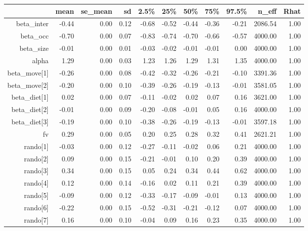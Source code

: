 \begin{table}[ht]
\centering
\begin{tabular}{rrrrrrrrrrr}
  \hline
 & mean & se\_mean & sd & 2.5\% & 25\% & 50\% & 75\% & 97.5\% & n\_eff & Rhat \\ 
  \hline
beta\_inter & -0.44 & 0.00 & 0.12 & -0.68 & -0.52 & -0.44 & -0.36 & -0.21 & 2086.54 & 1.00 \\ 
  beta\_occ & -0.70 & 0.00 & 0.07 & -0.83 & -0.74 & -0.70 & -0.66 & -0.57 & 4000.00 & 1.00 \\ 
  beta\_size & -0.01 & 0.00 & 0.01 & -0.03 & -0.02 & -0.01 & -0.01 & 0.00 & 4000.00 & 1.00 \\ 
  alpha & 1.29 & 0.00 & 0.03 & 1.23 & 1.26 & 1.29 & 1.31 & 1.35 & 4000.00 & 1.00 \\ 
  beta\_move[1] & -0.26 & 0.00 & 0.08 & -0.42 & -0.32 & -0.26 & -0.21 & -0.10 & 3391.36 & 1.00 \\ 
  beta\_move[2] & -0.20 & 0.00 & 0.10 & -0.39 & -0.26 & -0.19 & -0.13 & -0.01 & 3581.05 & 1.00 \\ 
  beta\_diet[1] & 0.02 & 0.00 & 0.07 & -0.11 & -0.02 & 0.02 & 0.07 & 0.16 & 3621.00 & 1.00 \\ 
  beta\_diet[2] & -0.01 & 0.00 & 0.09 & -0.20 & -0.08 & -0.01 & 0.05 & 0.16 & 4000.00 & 1.00 \\ 
  beta\_diet[3] & -0.19 & 0.00 & 0.10 & -0.38 & -0.26 & -0.19 & -0.13 & -0.01 & 3597.18 & 1.00 \\ 
  fv & 0.29 & 0.00 & 0.05 & 0.20 & 0.25 & 0.28 & 0.32 & 0.41 & 2621.21 & 1.00 \\ 
  rando[1] & -0.03 & 0.00 & 0.12 & -0.27 & -0.11 & -0.02 & 0.06 & 0.21 & 4000.00 & 1.00 \\ 
  rando[2] & 0.09 & 0.00 & 0.15 & -0.21 & -0.01 & 0.10 & 0.20 & 0.39 & 4000.00 & 1.00 \\ 
  rando[3] & 0.34 & 0.00 & 0.15 & 0.05 & 0.24 & 0.34 & 0.44 & 0.62 & 4000.00 & 1.00 \\ 
  rando[4] & 0.12 & 0.00 & 0.14 & -0.16 & 0.02 & 0.11 & 0.21 & 0.39 & 4000.00 & 1.00 \\ 
  rando[5] & -0.09 & 0.00 & 0.12 & -0.33 & -0.17 & -0.09 & -0.01 & 0.13 & 4000.00 & 1.00 \\ 
  rando[6] & -0.22 & 0.00 & 0.15 & -0.52 & -0.31 & -0.21 & -0.12 & 0.07 & 4000.00 & 1.00 \\ 
  rando[7] & 0.16 & 0.00 & 0.10 & -0.04 & 0.09 & 0.16 & 0.23 & 0.35 & 4000.00 & 1.00 \\ 

\end{tabular}
\end{table}
